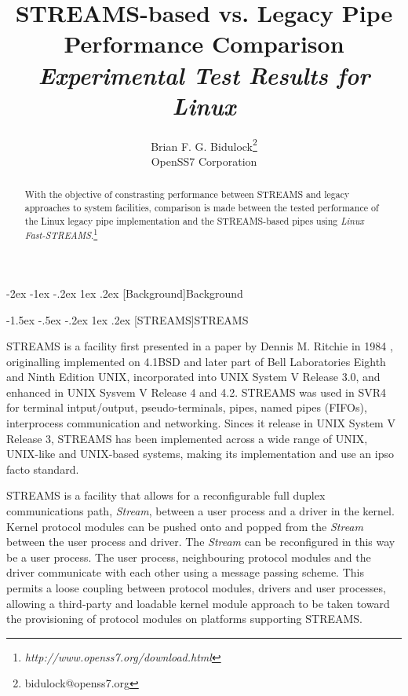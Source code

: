 \documentclass[letterpaper,final,notitlepage,twocolumn,10pt,twoside]{article}
\makeatletter
\let\large\normalsize
\let\normalsize\small
\let\small\footnotesize
\let\footnotesize\scriptsize
\let\scriptsize\tiny
\renewcommand\section{\@startsection {section}{1}{\z@}%
                                   {-2ex \@plus -1ex \@minus -.2ex}%
                                   {1ex \@plus .2ex}%
                                   {\normalfont\large\bfseries}}
\renewcommand\subsection{\@startsection{subsection}{2}{\z@}%
                                     {-1.5ex \@plus -.5ex \@minus -.2ex}%
                                     {1ex \@plus .2ex}%
                                     {\normalfont\normalsize\bfseries}}
\makeatother
\begin{document}

\title{STREAMS-based vs. Legacy Pipe Performance Comparison\\[0.5ex]
	{\large \textsl{Experimental Test Results for Linux}}}
\author{Brian F. G. Bidulock\thanks{bidulock@openss7.org}\\
	OpenSS7 Corporation}
\maketitle

\begin{abstract}
With the objective of constrasting performance between STREAMS and legacy approaches to system
facilities, comparison is made between the tested performance of the Linux legacy pipe
implementation and the STREAMS-based pipes using \textsl{Linux
Fast-STREAMS}.\footnote{\textit{http://www.openss7.org/download.html}}
\end{abstract}


\section[Background]{Background}

\subsection[STREAMS]{STREAMS}

STREAMS is a facility first presented in a paper by Dennis M. Ritchie in 1984
\cite[]{Ritchie84}, originalling implemented on 4.1BSD and later part of Bell
Laboratories Eighth and Ninth Edition UNIX, incorporated into UNIX System V
Release 3.0, and enhanced in UNIX Sysvem V Release 4 and 4.2.  STREAMS was
used in SVR4 for terminal intput/output, pseudo-terminals, pipes, named pipes
(FIFOs), interprocess communication and networking.  Sinces it release in UNIX
System V Release 3, STREAMS has been implemented across a wide range of UNIX,
UNIX-like and UNIX-based systems, making its implementation and use an ipso
facto standard.

STREAMS is a facility that allows for a reconfigurable full duplex
communications path, \textit{Stream}, between a user process and a driver in
the kernel.   Kernel protocol modules can be pushed onto and popped from the
\textit{Stream} between the user process and driver.  The \textit{Stream} can
be reconfigured in this way be a user process.  The user process, neighbouring
protocol modules and the driver communicate with each other using a message
passing scheme.  This permits a loose coupling between protocol modules,
drivers and user processes, allowing a third-party and loadable kernel module
approach to be taken toward the provisioning of protocol modules on platforms
supporting STREAMS.
\end{document}
